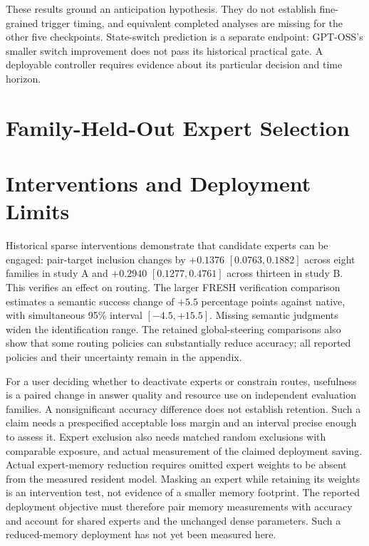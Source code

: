These results ground an anticipation hypothesis. They do not establish
fine-grained trigger timing, and equivalent completed analyses are missing
for the other five checkpoints. State-switch prediction is a separate
endpoint: GPT-OSS's smaller switch improvement does not pass its historical
practical gate. A deployable controller requires evidence about its
particular decision and time horizon.

\section{Family-Held-Out Expert Selection}
\label{sec:analysis-package}



\section{Interventions and Deployment Limits}

Historical sparse interventions demonstrate that candidate experts can
be engaged: pair-target inclusion changes by $+0.1376$
$[0.0763,0.1882]$ across eight families in study A and $+0.2940$
$[0.1277,0.4761]$ across thirteen in study B. This verifies an effect on
routing. The larger FRESH verification comparison estimates a semantic
success change of $+5.5$ percentage points against native, with
simultaneous 95\% interval $[-4.5,+15.5]$. Missing semantic judgments widen
the identification range. The retained global-steering comparisons also
show that some routing policies can substantially reduce accuracy; all
reported policies and their uncertainty remain in the appendix.

For a user deciding whether to deactivate experts or constrain routes,
usefulness is a paired change in answer quality and resource use on
independent evaluation families. A nonsignificant accuracy difference
does not establish retention. Such a claim needs a prespecified acceptable
loss margin and an interval precise enough to assess it. Expert exclusion
also needs matched random exclusions with comparable exposure, and actual
measurement of the claimed deployment saving. Actual expert-memory reduction requires omitted expert weights to be
absent from the measured resident model. Masking an expert while retaining
its weights is an intervention test, not evidence of a smaller memory
footprint. The reported deployment objective must therefore pair memory
measurements with accuracy and account for shared experts and the
unchanged dense parameters. Such a reduced-memory deployment has not yet
been measured here.

